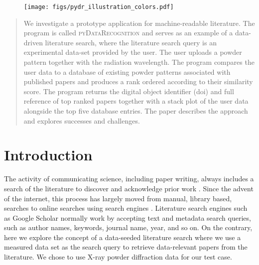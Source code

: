 \documentclass[preprint]{iucr}
\newcommand{\pydr}{\textsc{pyDataRecognition}\xspace}
\providecommand{\DIFaddend}{} %
\DeclareRobustCommand{\DIFaddend}{\DIFOaddend \let\includegraphics\DIFOincludegraphics} %
\begin{document}
\DIFaddend {}
%
\maketitle
%
\begin{figure}
    \centering
    \texttt{[image: figs/pydr\_illustration\_colors.pdf]}
    \label{fig:pydr_illustration}
\end{figure}
%
\renewcommand\thefigure{\arabic{figure}} 
\setcounter{figure}{0} 
%
\begin{abstract}

We investigate a prototype application for machine-readable literature. The program is called \pydr and serves as an example of a data-driven literature search, where the literature search query is an experimental data-set provided by the user. The user uploads a powder pattern together with the radiation wavelength. The program compares the user data to a database of existing powder patterns associated with published papers and produces a rank ordered according to their similarity score. The program returns the digital object identifier (doi) and full reference of top ranked papers together with a stack plot of the user data alongside the top five database entries. The paper describes the approach and explores successes and challenges.

\end{abstract}
%
\section{Introduction}

The activity of communicating science, including paper writing, always includes a search of the literature to discover and acknowledge prior work \cite{garfieldWhenCite1996}.  Since the advent of the internet, this process has largely moved from manual,  library based, searches to online searches using search engines \cite{butlerSoupedupSearchEngines2000}.
Literature search engines such as Google Scholar \cite{vannoordenGoogleScholarPioneer2014} normally work by accepting text and metadata search queries, such as author names, keywords, journal name, year, and so on.  On the contrary, here we explore the concept of a data-seeded literature search where we use a measured data set as the search query to retrieve data-relevant papers from the literature.  We chose to use  X-ray powder diffraction data for our test case.
\end{document}
